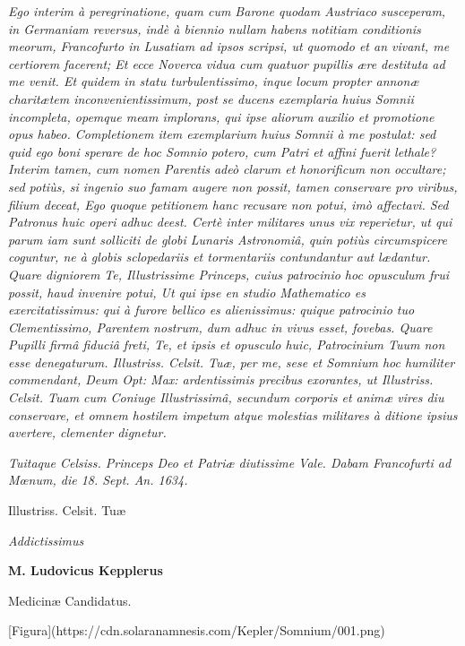 \documentclass[a4paper, 11pt, oneside, polutonikogreek, german]{article}
\begin{document}
\emph{Ego interim à peregrinatione, quam cum Barone quodam Austriaco susceperam, in Germaniam reversus, indè à biennio nullam habens notitiam conditionis meorum, Francofurto in Lusatiam ad ipsos scripsi, ut quomodo et an vivant, me certiorem facerent; Et ecce Noverca vidua cum quatuor pupillis ære destituta ad me venit. Et quidem in statu turbulentissimo, inque locum propter annonæ charitætem inconvenientissimum, post se ducens exemplaria huius Somnii incompleta, opemque meam implorans, qui ipse aliorum auxilio et promotione opus habeo. Completionem item exemplarium huius Somnii à me postulat: sed quid ego boni sperare de hoc Somnio potero, cum Patri et affini fuerit lethale? Interim tamen, cum nomen Parentis adeò clarum et honorificum non occultare; sed potiùs, si ingenio suo famam augere non possit, tamen conservare pro viribus, filium deceat, Ego quoque petitionem hanc recusare non potui, imò affectavi. Sed Patronus huic operi adhuc deest. Certè inter militares unus vix reperietur, ut qui parum iam sunt solliciti de globi Lunaris Astronomiâ, quin potiùs circumspicere coguntur, ne à globis sclopedariis et tormentariis contundantur aut lædantur. Quare digniorem Te, Illustrissime Princeps, cuius patrocinio hoc opusculum frui possit, haud invenire potui, Ut qui ipse en studio Mathematico es exercitatissimus: qui à furore bellico es alienissimus: quique patrocinio tuo Clementissimo, Parentem nostrum, dum adhuc in vivus esset, fovebas. Quare Pupilli firmâ fiduciâ freti, Te, et ipsis et opusculo huic, Patrocinium Tuum non esse denegaturum. Illustriss. Celsit. Tuæ, per me, sese et Somnium hoc humiliter commendant, Deum Opt: Max: ardentissimis precibus exorantes, ut Illustriss. Celsit. Tuam cum Coniuge Illustrissimâ, secundum corporis et animæ vires diu conservare, et omnem hostilem impetum atque molestias militares à ditione ipsius avertere, clementer dignetur.}

\bigskip

\emph{Tuitaque Celsiss. Princeps Deo et Patriæ diutissime Vale. Dabam Francofurti ad Mœnum, die 18. Sept. An. 1634.}

\begin{center}
Illustriss. Celsit. Tuæ

\emph{Addictissimus}

\textbf{M. Ludovicus Kepplerus}

Medicinæ Candidatus.
\end{center}
\clearpage

[Figura](https://cdn.solaranamnesis.com/Kepler/Somnium/001.png)
\end{document}
